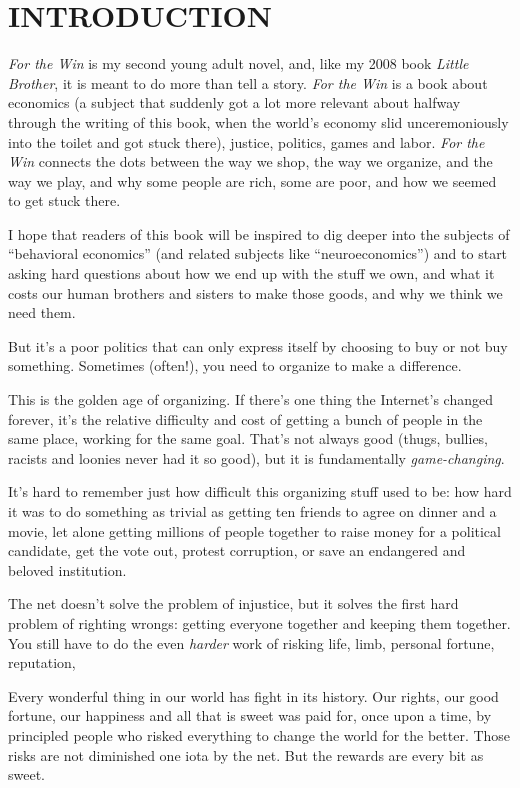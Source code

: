 \section{INTRODUCTION}

\emph{For the Win} is my second young adult novel, and, like my
2008 book \emph{Little Brother}, it is meant to do more than tell a
story. \emph{For the Win} is a book about economics (a subject that
suddenly got a lot more relevant about halfway through the writing
of this book, when the world's economy slid unceremoniously into
the toilet and got stuck there), justice, politics, games and
labor. \emph{For the Win} connects the dots between the way we
shop, the way we organize, and the way we play, and why some people
are rich, some are poor, and how we seemed to get stuck there.

I hope that readers of this book will be inspired to dig deeper
into the subjects of ``behavioral economics'' (and related subjects
like ``neuroeconomics'') and to start asking hard questions about how
we end up with the stuff we own, and what it costs our human
brothers and sisters to make those goods, and why we think we need
them.

But it's a poor politics that can only express itself by choosing
to buy or not buy something. Sometimes (often!), you need to
organize to make a difference.

This is the golden age of organizing. If there's one thing the
Internet's changed forever, it's the relative difficulty and cost
of getting a bunch of people in the same place, working for the
same goal. That's not always good (thugs, bullies, racists and
loonies never had it so good), but it is fundamentally
\emph{game-changing}.

It's hard to remember just how difficult this organizing stuff used
to be: how hard it was to do something as trivial as getting ten
friends to agree on dinner and a movie, let alone getting millions
of people together to raise money for a political candidate, get
the vote out, protest corruption, or save an endangered and beloved
institution.

The net doesn't solve the problem of injustice, but it solves the
first hard problem of righting wrongs: getting everyone together
and keeping them together. You still have to do the even
\emph{harder} work of risking life, limb, personal fortune,
reputation,

Every wonderful thing in our world has fight in its history. Our
rights, our good fortune, our happiness and all that is sweet was
paid for, once upon a time, by principled people who risked
everything to change the world for the better. Those risks are not
diminished one iota by the net. But the rewards are every bit as
sweet.


